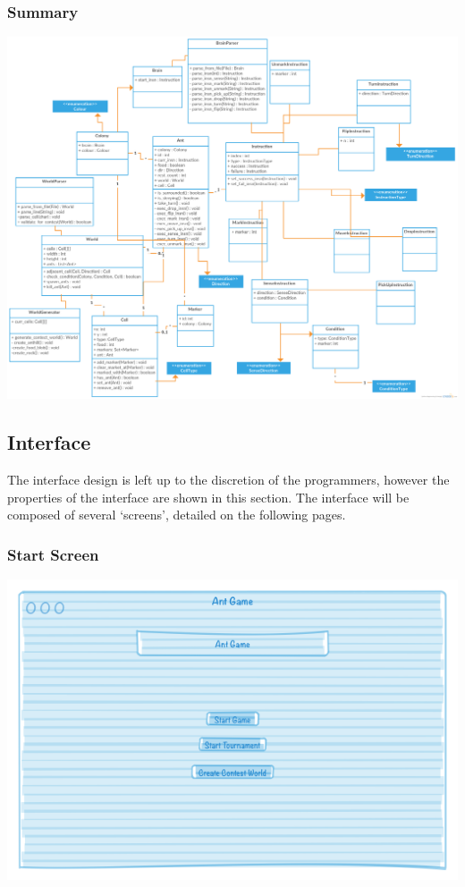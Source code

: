 \documentclass[11pt]{article}
\begin{document}
\subsubsection{Summary}

\begin{center}
\includegraphics[width=\textwidth]{low-level-diagrams/class/all}
\end{center}

\newpage
\subsection{Interface}

The interface design is left up to the discretion of the programmers, however the properties of the interface are shown in this section. The interface will be composed of several `screens', detailed on the following pages.

\subsubsection{Start Screen}

\begin{center}
\includegraphics[width=\textwidth]{low-level-diagrams/interface/start-screen}
\end{center}
\end{document}
